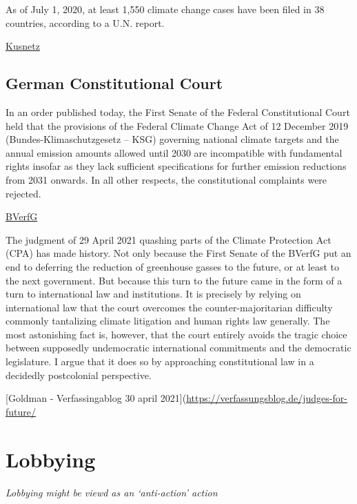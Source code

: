 \documentclass[
]{book}
\begin{document}
As of July 1, 2020, at least 1,550 climate change cases have been filed in 38 countries, according to a U.N. report.

\href{https://insideclimatenews.org/news/07042021/climate-crisis-ecocide-vanuatu-the-fifth-crime/}{Kusnetz}

\hypertarget{german-constitutional-court}{%
\section{German Constitutional Court}\label{german-constitutional-court}}

In an order published today, the First Senate of the Federal Constitutional Court held that the provisions of the Federal Climate Change Act of 12 December 2019 (Bundes-Klimaschutzgesetz -- KSG) governing national climate targets and the annual emission amounts allowed until 2030 are incompatible with fundamental rights insofar as they lack sufficient specifications for further emission reductions from 2031 onwards. In all other respects, the constitutional complaints were rejected.

\href{https://www.bundesverfassungsgericht.de/SharedDocs/Pressemitteilungen/EN/2021/bvg21-031.html}{BVerfG}

The judgment of 29 April 2021 quashing parts of the Climate Protection Act (CPA) has made history. Not only because the First Senate of the BVerfG put an end to deferring the reduction of greenhouse gasses to the future, or at least to the next government. But because this turn to the future came in the form of a turn to international law and institutions. It is precisely by relying on international law that the court overcomes the counter-majoritarian difficulty commonly tantalizing climate litigation and human rights law generally. The most astonishing fact is, however, that the court entirely avoids the tragic choice between supposedly undemocratic international commitments and the democratic legislature. I argue that it does so by approaching constitutional law in a decidedly postcolonial perspective.

{[}Goldman - Verfassingablog 30 april 2021{]}(\url{https://verfassungsblog.de/judges-for-future/}

\hypertarget{lobbying}{%
\chapter{Lobbying}\label{lobbying}}

\emph{Lobbying might be viewd as an `anti-action' action}
\end{document}
